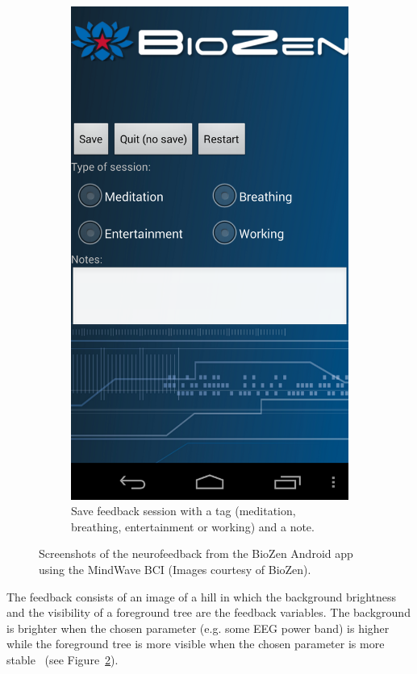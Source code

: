 \documentclass[a4paper,10pt,english,lof,lot,twoside]{puthesis}
\begin{document}
\begin{figure}
\begin{subfigure}[t]{0.30\linewidth}
\includegraphics[width=0.800\linewidth]{biozen_feedback_save.png}
\caption[Save feedback session.]{Save feedback session with a tag (meditation, breathing, entertainment or
working) and a note.}\label{ch-background/index:fig-background-biozen-feedback-save}\end{subfigure}
\caption[Screen shoots of the neurofeedback from the BioZen Android app using the MindWave BCI]{Screenshots of the neurofeedback from the BioZen Android app using
the MindWave BCI (Images courtesy of BioZen).}\label{ch-background/index:fig-background-biozen-app-feedback}

\end{figure}


The feedback consists of an image of a hill in which the background brightness
and the visibility of a foreground tree are the feedback variables. The
background is brighter when the chosen parameter (e.g. some EEG power band) is
higher while the foreground tree is more visible when the chosen parameter is
more stable \cite{t2_biozenusersman_1_7_0.pdf_2013} (see Figure \ref{ch-background/index:fig-background-biozen-app-feedback}).
\end{document}
